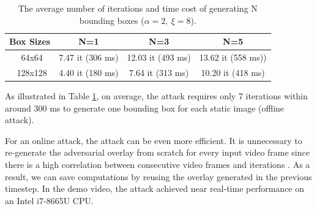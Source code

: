 \begin{table}[H]
    \centering
    \begin{tabular}{cccc}
    \hline
    Box Sizes & N=1 & N=3 & N=5\\
    \hline
    \ 64x64    & 7.47 it (306 ms)  & 12.03 it (493 ms) &  13.62 it (558 ms)) \\
    \ 128x128  & 4.40 it (180 ms)  & 7.64 it (313 ms) & 10.20 it (418 ms) \\
    \hline
    \end{tabular}
    \caption{The average number of iterations and time cost of generating N bounding boxes ($\alpha=2,\ \xi=8$).}
    \label{tab:fix-box}
\end{table}

As illustrated in Table \ref{tab:fix-box}, on average, the attack requires only 7 iterations within around 300 ms to generate one bounding box for each static image (offline attack). 

For an online attack, the attack can be even more efficient. It is unnecessary to re-generate the adversarial overlay from scratch for every input video frame since there is a high correlation between consecutive video frames and iterations \citep{ilyas2018prior}. As a result, we can save computations by reusing the overlay generated in the previous timestep. In the demo video, the attack achieved near real-time performance on an Intel i7-8665U CPU.

\clearpage
\vfill

